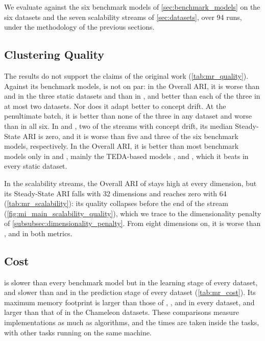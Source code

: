 We evaluate \MicroTEDAClus against the six benchmark models of \cref{sec:benchmark_models} on the six datasets and the seven scalability streams of \cref{sec:datasets}, over 94 runs, under the methodology of the previous sections.

\subsection{Clustering Quality}



The results do not support the claims of the original work (\cref{tab:mr_quality}). Against its benchmark models, \MicroTEDAClus is not on par: in the Overall ARI, it is worse than \CluStream and \StreamKM in the three static datasets and than \DenStream in \BenchmarkOne, and better than each of the three in at most two datasets. Nor does it adapt better to concept drift. At the penultimate batch, it is better than none of the three in any dataset and worse than \StreamKM in all six. In \BenchmarkOne and \RandomRBFGeneratorEvents, two of the streams with concept drift, its median Steady-State ARI is zero, and it is worse than five and three of the six benchmark models, respectively. In the Overall ARI, it is better than most benchmark models only in \BenchmarkTwo and \ChameleonDSThree, mainly the TEDA-based models \AutoCloud, \CEDAS and \TEDACloud, which it beats in every static dataset.



In the scalability streams, the Overall ARI of \MicroTEDAClus stays high at every dimension, but its Steady-State ARI falls with 32 dimensions and reaches zero with 64 (\cref{tab:mr_scalability}): its quality collapses before the end of the stream (\cref{fig:mi_main_scalability_quality}), which we trace to the dimensionality penalty of \cref{subsubsec:dimensionality_penalty}. From eight dimensions on, it is worse than \CluStream, \StreamKM and \CEDAS in both metrics.

\subsection{Cost}



\MicroTEDAClus is slower than every benchmark model but \AutoCloud in the learning stage of every dataset, and slower than \StreamKM and \CEDAS in the prediction stage of every dataset (\cref{tab:mr_cost}). Its maximum memory footprint is larger than those of \DenStream, \StreamKM, \CEDAS and \TEDACloud in every dataset, and larger than that of \CluStream in the Chameleon datasets. These comparisons measure implementations as much as algorithms, and the times are taken inside the tasks, with other tasks running on the same machine.


